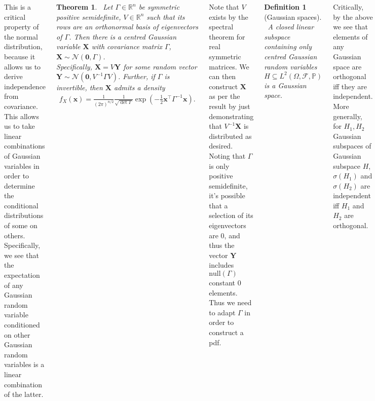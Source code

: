 \documentclass{tikzposter} %
\newtheorem{theorem}{Theorem}
\newtheorem{definition}{Definition}
\begin{document}
\begin{columns}
{    This is a critical property of the normal distribution, because it allows us to derive independence from covariance. This allows us to take linear combinations of Gaussian variables in order to determine the conditional distributions of some on others. Specifically, we see that the expectation of any Gaussian random variable conditioned on other Gaussian random variables is a linear combination of the latter. \\

    \begin{theorem}
      \ Let $\Gamma \in \mathbb{R}^{n}$ be symmetric positive semidefinite, $V \in \mathbb{R}^{n}$ such that its rows are an orthonormal basis of eigenvectors of $\Gamma$. Then there is a centred Gaussian variable $\bm{X}$ with covariance matrix $\Gamma$, $\bm{X} \sim \mathcal{N}(\bm{0}, \Gamma)$. \\

      Specifically, $\bm{X} = V\bm{Y}$ for some random vector $\bm{Y} \sim \mathcal{N}(\bm{0}, V^{-1}\Gamma V)$. Further, if $\Gamma$ is invertible, then $\bm{X}$ admits a density
    \begin{align*}
      f_{X}(\bm{x}) = \frac{1}{(2\pi)^{n/2}} \frac{1}{\sqrt{\det \Gamma}} \exp\left(-\frac{1}{2}\bm{x}^{\top}\Gamma^{-1}\bm{x}\right).
    \end{align*}
    \end{theorem}
    \hphantom{}

    Note that $V$ exists by the spectral theorem for real symmetric matrices. We can then construct $\bm{X}$ as per the result by just demonstrating that $V^{-1}\bm{X}$ is distributed as desired. Noting that $\Gamma$ is only positive semidefinite, it's possible that a selection of its eigenvectors are $0$, and thus the vector $\bm{Y}$ includes $\mathrm{null}(\Gamma)$ constant $0$ elements. Thus we need to adapt $\Gamma$ in order to construct a pdf. \\

    \begin{definition}[Gaussian spaces]
    \ A closed linear subspace containing only centred Gaussian random variables $H \subseteq L^{2}(\Omega, \mathcal{F}, \mathbb{P})$ is a Gaussian space.
    \end{definition}
    \hphantom{}

    Critically, by the above we see that elements of any Gaussian space are orthogonal iff they are independent. More generally, for $H_{1}, H_{2}$ Gaussian subspaces of Gaussian subspace $H$, $\sigma(H_{1})$ and $\sigma(H_{2})$ are independent iff $H_{1}$ and $H_{2}$ are orthogonal. \\

}
\end{columns}
\end{document}
